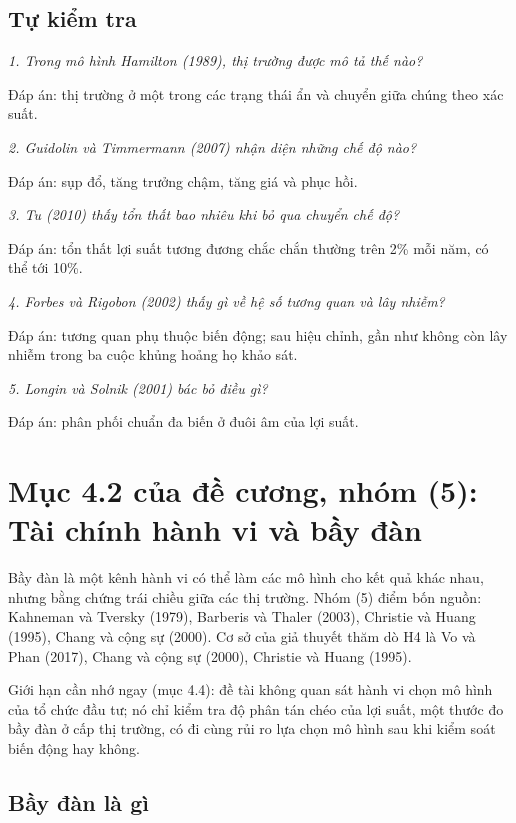 \section{Tự kiểm tra}

{\itshape 1. Trong mô hình Hamilton (1989), thị trường được mô tả thế nào?\par}

Đáp án: thị trường ở một trong các trạng thái ẩn và chuyển giữa chúng theo xác suất.

{\itshape 2. Guidolin và Timmermann (2007) nhận diện những chế độ nào?\par}

Đáp án: sụp đổ, tăng trưởng chậm, tăng giá và phục hồi.

{\itshape 3. Tu (2010) thấy tổn thất bao nhiêu khi bỏ qua chuyển chế độ?\par}

Đáp án: tổn thất lợi suất tương đương chắc chắn thường trên 2\% mỗi năm, có thể tới 10\%.

{\itshape 4. Forbes và Rigobon (2002) thấy gì về hệ số tương quan và lây nhiễm?\par}

Đáp án: tương quan phụ thuộc biến động; sau hiệu chỉnh, gần như không còn lây nhiễm trong ba cuộc khủng hoảng họ khảo sát.

{\itshape 5. Longin và Solnik (2001) bác bỏ điều gì?\par}

Đáp án: phân phối chuẩn đa biến ở đuôi âm của lợi suất.

\chapter{Mục 4.2 của đề cương, nhóm (5): Tài chính hành vi và bầy đàn}

Bầy đàn là một kênh hành vi có thể làm các mô hình cho kết quả khác nhau, nhưng bằng chứng trái chiều giữa các thị trường. Nhóm (5) điểm bốn nguồn: Kahneman và Tversky (1979), Barberis và Thaler (2003), Christie và Huang (1995), Chang và cộng sự (2000). Cơ sở của giả thuyết thăm dò H4 là Vo và Phan (2017), Chang và cộng sự (2000), Christie và Huang (1995).

Giới hạn cần nhớ ngay (mục 4.4): đề tài không quan sát hành vi chọn mô hình của tổ chức đầu tư; nó chỉ kiểm tra độ phân tán chéo của lợi suất, một thước đo bầy đàn ở cấp thị trường, có đi cùng rủi ro lựa chọn mô hình sau khi kiểm soát biến động hay không.

\section{Bầy đàn là gì}

